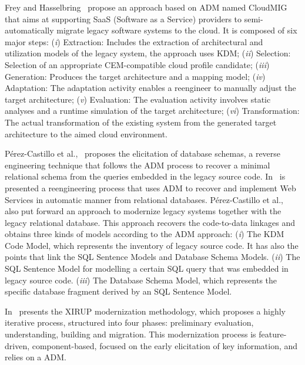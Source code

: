 Frey and Hasselbring~\cite{5741334, SMR:SMR582} propose an approach based on ADM named CloudMIG that aims at supporting SaaS (Software as a Service) providers to semi-automatically migrate legacy software systems to the cloud. It is composed of six major steps: (\textit{i}) Extraction: Includes the extraction of architectural and utilization models of the legacy system, the approach uses KDM; (\textit{ii}) Selection: Selection of an appropriate CEM-compatible cloud profile candidate; (\textit{iii}) Generation: Produces the target architecture and a mapping model; (\textit{iv}) Adaptation: The adaptation activity enables a reengineer to manually adjust the target architecture; (\textit{v}) Evaluation: The evaluation activity involves static analyses and a runtime simulation of the target architecture; (\textit{vi}) Transformation: The actual transformation of the existing system from the generated target architecture to the aimed cloud environment.

P\'{e}rez-Castillo et al.,~\cite{ICEISPerez:CastilloGCP12} proposes the elicitation of database schemas, a reverse engineering technique that follows the ADM process to recover a minimal relational schema from the queries embedded in the legacy source code. In~\cite{delCastillo:2009:PRP:1529282.1529753} is presented a reengineering process that uses ADM to recover and implement Web Services in automatic manner from relational databases. P\'{e}rez-Castillo et al.,~\cite{5328801} also put forward an approach to modernize legacy systems together with the legacy relational database. This approach recovers the code-to-data linkages and obtains three kinds of models according to the ADM approach: (\textit{i}) The KDM Code Model, which represents the inventory of legacy source code. It has also the points that link the SQL Sentence Models and Database Schema Models. (\textit{ii}) The SQL Sentence Model for modelling a certain SQL query that was embedded in legacy source code. (\textit{iii}) The Database Schema Model, which represents the specific database fragment derived by an SQL Sentence Model.

In~\cite{FuentesFernandez2012247} presents the XIRUP modernization methodology, which proposes a highly iterative process, structured into four phases: preliminary evaluation, understanding, building and migration. This modernization process is feature-driven, component-based, focused on the early elicitation of key information, and relies on a ADM.

